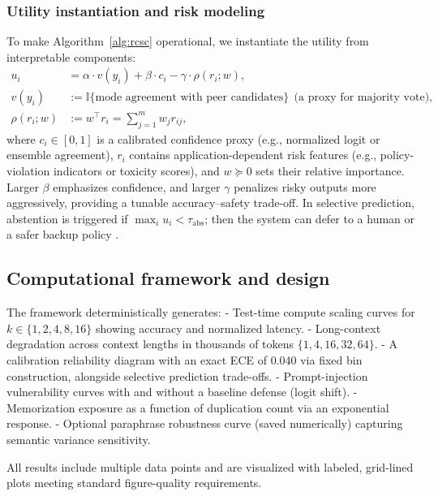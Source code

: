 \documentclass[10pt]{article}
\begin{document}
\subsubsection*{Utility instantiation and risk modeling}
To make Algorithm~\ref{alg:rcsc} operational, we instantiate the utility from interpretable components:
\begin{align}
u_i &= \alpha \cdot v(y_i) + \beta \cdot c_i - \gamma \cdot \rho(r_i; w), \\
v(y_i) &:= \mathbb{I}\{\text{mode agreement with peer candidates}\} \ \ \text{(a proxy for majority vote)}, \\
\rho(r_i; w) &:= w^\top r_i = \sum_{j=1}^{m} w_j r_{ij},
\end{align}
where $c_i \in [0,1]$ is a calibrated confidence proxy (e.g., normalized logit or ensemble agreement), $r_i$ contains application-dependent risk features (e.g., policy-violation indicators or toxicity scores), and $w \succeq 0$ sets their relative importance. Larger $\beta$ emphasizes confidence, and larger $\gamma$ penalizes risky outputs more aggressively, providing a tunable accuracy–safety trade-off. In selective prediction, abstention is triggered if $\max_i u_i < \tau_{\mathrm{abs}}$; then the system can defer to a human or a safer backup policy \citep{Geifman2017Selective, Kadavath2022KnowWhatKnow}.

\subsection{Computational framework and design}
The framework deterministically generates:
- Test-time compute scaling curves for $k \in \{1,2,4,8,16\}$ showing accuracy and normalized latency.
- Long-context degradation across context lengths in thousands of tokens $\{1,4,16,32,64\}$.
- A calibration reliability diagram with an exact ECE of 0.040 via fixed bin construction, alongside selective prediction trade-offs.
- Prompt-injection vulnerability curves with and without a baseline defense (logit shift).
- Memorization exposure as a function of duplication count via an exponential response.
- Optional paraphrase robustness curve (saved numerically) capturing semantic variance sensitivity.

All results include multiple data points and are visualized with labeled, grid-lined plots meeting standard figure-quality requirements.
\end{document}
